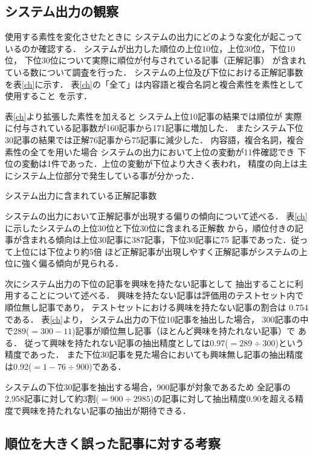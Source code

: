 \documentclass[japanese]{jnlp_1.4}
\begin{document}
\subsection{システム出力の観察}

使用する素性を変化させたときに
システムの出力にどのような変化が起こっているのか確認する．
システムが出力した順位の上位10位，上位30位，下位10位，
下位30位について実際に順位が付与されている記事（正解記事）
が含まれている数について調査を行った．
システムの上位及び下位における正解記事数を表\ref{ch}に示す．
表\ref{ch}の「全て」は内容語と複合名詞と複合素性を素性として使用すること
を示す．

表\ref{ch}より拡張した素性を加えると
システム上位10記事の結果では順位が
実際に付与されている記事数が160記事から171記事に増加した．
またシステム下位30記事の結果では正解76記事から75記事に減少した．
内容語，複合名詞，複合素性の全てを用いた場合
システムの出力において上位の変動が11件確認でき
下位の変動は1件であった．上位の変動が下位より大きく表われ，
精度の向上は主にシステム上位部分で発生している事が分かった．


\begin{table}[t]
\caption{システム出力に含まれている正解記事数}

\label{ch}
\end{table}

システムの出力において正解記事が出現する偏りの傾向について述べる．
表\ref{ch}に示したシステムの上位30位と下位30位に含まれる正解数
から，順位付きの記事が含まれる傾向は上位30記事に387記事，下位30記事に75
記事であった．従って上位には下位より約5倍
ほど正解記事が出現しやすく正解記事がシステムの上位に強く偏る傾向が見られる．


次にシステム出力の下位の記事を興味を持たない記事として
抽出することに利用することについて述べる．
興味を持たない記事は評価用のテストセット内で順位無し記事であり，
テストセットにおける興味を持たない記事の割合は
0.754である．
表\ref{ch}より，
システム出力の下位10記事を抽出した場合，
300記事の中で289($=300-11$)記事が順位無し記事（ほとんど興味を持たれない記事）で
ある．
従って興味を持たれない記事の抽出精度としては0.97($=289 \div 300$)という精度であった．
また下位30記事を見た場合においても興味無し記事の抽出精度は0.92($=1-76
\div 900 $)である．

システムの下位30記事を抽出する場合，900記事が対象であるため
全記事の2,958記事に対して約3割($=900 \div 2985 $)の記事に対して抽出精度0.90を超える精度で興味を持たれない記事の抽出が期待できる．



\subsection{順位を大きく誤った記事に対する考察}
\end{document}
